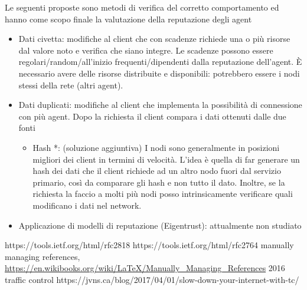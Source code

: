 \documentclass[]{article}
\begin{document}
	Le seguenti proposte sono metodi di verifica del corretto comportamento ed hanno come scopo finale la valutazione della reputazione degli agent
	\begin{itemize}
		\item Dati civetta: modifiche al client che con scadenze richiede una o più risorse dal valore noto e verifica che siano integre. Le scadenze possono essere regolari/random/all’inizio frequenti/dipendenti dalla reputazione dell’agent. È necessario avere delle risorse distribuite e disponibili: potrebbero essere i nodi stessi della rete (altri agent).
		\item Dati duplicati: modifiche al client che implementa la possibilità di connessione con più agent. Dopo la richiesta il client compara i dati ottenuti dalle due fonti
		\begin{itemize}
			\item Hash *: (soluzione aggiuntiva) I nodi sono generalmente in posizioni migliori dei client in termini di velocità. L’idea è quella di far generare un hash dei dati che il client richiede ad un altro nodo fuori dal servizio primario, così da comparare gli hash e non tutto il dato.
			Inoltre, se la richiesta la faccio a molti più nodi posso intrinsicamente verificare quali modificano i dati nel network.
		\end{itemize}
		\item Applicazione di modelli di reputazione (Eigentrust): attualmente non studiato
	\end{itemize}

	
	\begin{thebibliography}{1}
			https://tools.ietf.org/html/rfc2818
			https://tools.ietf.org/html/rfc2764
			manually managing references, 
			\url{https://en.wikibooks.org/wiki/LaTeX/Manually_Managing_References}
			2016
			traffic control
			https://jvns.ca/blog/2017/04/01/slow-down-your-internet-with-tc/
	\end{thebibliography}
		
	\pagebreak
	
	
\end{document}
